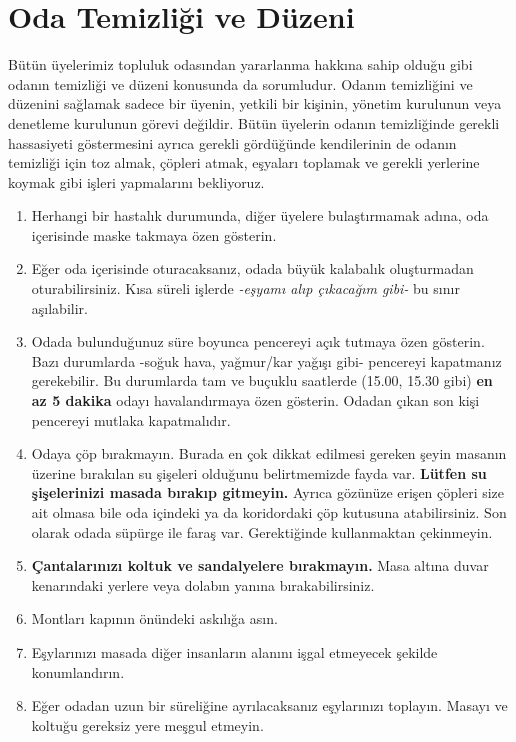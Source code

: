 \documentclass{article}
\begin{document}
\section{Oda Temizliği ve Düzeni}
Bütün üyelerimiz topluluk odasından yararlanma hakkına sahip olduğu gibi odanın temizliği ve düzeni konusunda da sorumludur. Odanın temizliğini ve düzenini sağlamak sadece bir üyenin, yetkili bir kişinin, yönetim kurulunun veya denetleme kurulunun görevi değildir. Bütün üyelerin odanın temizliğinde gerekli hassasiyeti göstermesini ayrıca gerekli gördüğünde kendilerinin de odanın temizliği için toz almak, çöpleri atmak, eşyaları toplamak ve gerekli yerlerine koymak gibi işleri yapmalarını bekliyoruz.
\begin{enumerate}
    \item Herhangi bir hastalık durumunda, diğer üyelere bulaştırmamak adına, oda içerisinde maske takmaya özen gösterin.
    \item 	Eğer oda içerisinde oturacaksanız, odada büyük kalabalık oluşturmadan oturabilirsiniz. Kısa süreli işlerde \emph{-eşyamı alıp çıkacağım gibi-} bu sınır aşılabilir.
    \item 	Odada bulunduğunuz süre boyunca pencereyi açık tutmaya özen gösterin. Bazı durumlarda -soğuk hava, yağmur/kar yağışı gibi- pencereyi kapatmanız gerekebilir. Bu durumlarda tam ve buçuklu saatlerde (15.00, 15.30 gibi) \textbf{en az 5 dakika} odayı havalandırmaya özen gösterin. Odadan çıkan son kişi pencereyi mutlaka kapatmalıdır.
    \item 	Odaya çöp bırakmayın. Burada en çok dikkat edilmesi gereken şeyin masanın üzerine bırakılan su şişeleri olduğunu belirtmemizde fayda var. \textbf{Lütfen su şişelerinizi masada bırakıp gitmeyin.} Ayrıca gözünüze erişen çöpleri size ait olmasa bile oda içindeki ya da koridordaki çöp kutusuna atabilirsiniz. Son olarak odada süpürge ile faraş var. Gerektiğinde kullanmaktan çekinmeyin.
    \item \textbf{Çantalarınızı koltuk ve sandalyelere bırakmayın.} Masa altına duvar kenarındaki yerlere veya dolabın yanına bırakabilirsiniz.
    \item Montları kapının önündeki askılığa asın. 
    \item Eşylarınızı masada diğer insanların alanını işgal etmeyecek şekilde konumlandırın.
    \item Eğer odadan uzun bir süreliğine ayrılacaksanız eşylarınızı toplayın. Masayı ve koltuğu gereksiz yere meşgul etmeyin.
\end{enumerate}
\end{document}
